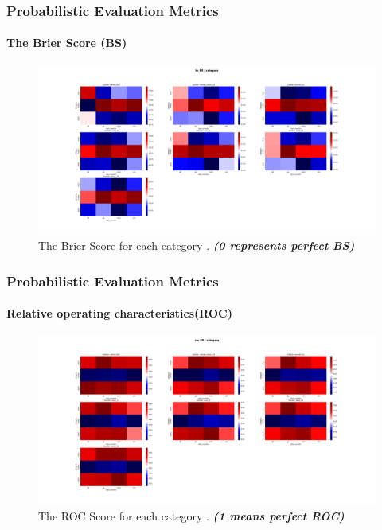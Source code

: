 \begin{frame}
\frametitle{Probabilistic Evaluation Metrics}
\framesubtitle{The Brier Score (BS)}
\begin{figure}[H]
    \centering
    \includegraphics[scale=0.15]{bs_RR_category.png}
    \caption{The Brier Score for each category  . \textbf{\textit{(0 represents perfect BS)}}}
\end{figure}
\end{frame}




\begin{frame}
\frametitle{Probabilistic Evaluation Metrics}
\framesubtitle{Relative operating characteristics(ROC)}

\begin{figure}[H]
    \centering
    \includegraphics[scale=0.15]{roc_RR_category.png}
    \caption{The ROC Score for each category  . \textbf{\textit{(1 means perfect ROC)}}}
\end{figure}
\end{frame}

